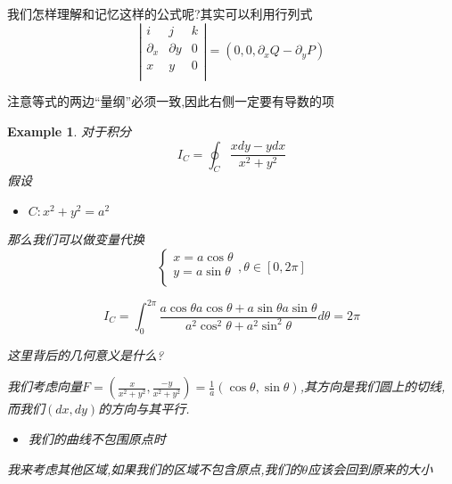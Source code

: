 \documentclass[11pt,hyperref,a4paper,UTF8]{ctexart}
\newtheorem{example}{Example}[subsection]
\newcommand{\parameter}[1]{\left(#1\right)}
\begin{document}
\begin{CJK}{UTF8}{gkai}
我们怎样理解和记忆这样的公式呢?其实可以利用行列式
\[\left|\begin{matrix}
  i & j & k\\
  \partial_x & \partial y & 0\\
  x & y & 0\\
\end{matrix}\right| = (0,0,\partial_x Q - \partial_y P)\]

注意等式的两边``量纲''必须一致,因此右侧一定要有导数的项

\begin{example}
  对于积分
  \[I_C = \oint_C \frac{xdy - ydx}{x^2 + y^2}\]
  假设
  \begin{itemize}
    \item $C : x^2 + y^2 = a^2$
  \end{itemize}
  那么我们可以做变量代换
  \[\begin{cases}
    x = a\cos \theta\\
    y = a\sin \theta\\
  \end{cases},\theta\in[0,2\pi]\]

  \[I_C = \int_{0}^{2\pi} \frac{a\cos \theta a\cos \theta + a\sin \theta a\sin \theta}{a^2 \cos^2\theta + a^2 \sin^2 \theta} d\theta= 2\pi\]

  这里背后的几何意义是什么?
  \begin{center}
  
  
  \end{center}
  我们考虑向量$F = \parameter{\frac{x}{x^2 + y^2},\frac{-y}{x^2 + y^2}}= \frac{1}{a}(\cos \theta,\sin \theta)$,其方向是我们圆上的切线,而我们$(dx,dy)$的方向与其平行.

  \begin{itemize}
    \item 我们的曲线不包围原点时
  \end{itemize}
  我来考虑其他区域,如果我们的区域不包含原点,我们的$\theta$应该会回到原来的大小


\end{example}
\end{CJK}
\end{document}
